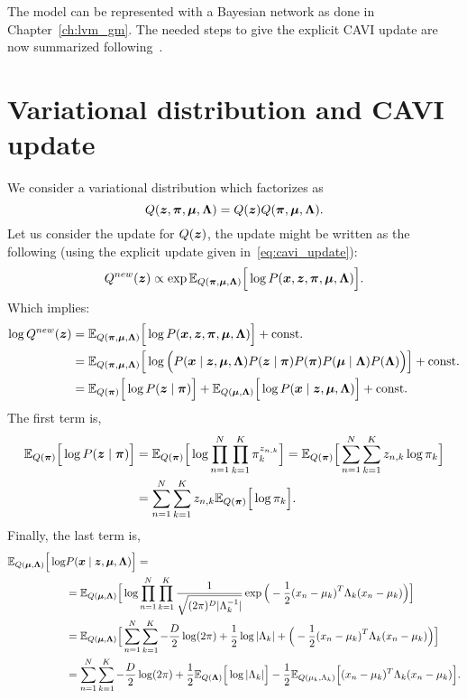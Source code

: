 The model can be represented with a Bayesian network as done in Chapter~\ref{ch:lvm_gm}. The needed steps to give the explicit CAVI update are now summarized following~\cite{bishop2006pattern}.

\section{Variational distribution and CAVI update}

We consider a variational distribution which factorizes as
\[
  Q(\bm{z}, \bm{\pi}, \bm{\mu}, \bm{\Lambda}) = Q(\bm{z})Q(\bm{\pi}, \bm{\mu}, \bm{\Lambda}).
\]
Let us consider the update for \(Q(\bm{z})\), the update might be written as the following (using the explicit update given in~\ref{eq:cavi_update}):
\[
  Q^{new}(\bm{z}) \propto \exp \mathbb{E}_{Q(\bm{\pi}, \bm{\mu}, \bm{\Lambda})}\Big[\log P(\bm{x}, \bm{z}, \bm{\pi}, \bm{\mu}, \bm{\Lambda})\Big].
\]
Which implies:
\[
  \begin{aligned}
    \log Q^{new}(\bm{z}) &= \mathbb{E}_{Q(\bm{\pi}, \bm{\mu}, \bm{\Lambda})}\Big[\log P(\bm{x}, \bm{z}, \bm{\pi}, \bm{\mu}, \bm{\Lambda})\Big] + \text{const.}\\
    &= \mathbb{E}_{Q(\bm{\pi}, \bm{\mu}, \bm{\Lambda})}\Big[\log \Big( P(\bm{x} \mid \bm{z}, \bm{\mu}, \bm{\Lambda})P(\bm{z} \mid \bm{\pi})P(\bm{\pi})P(\bm{\mu} \mid \bm{\Lambda})P(\bm{\Lambda}) \Big)\Big] + \text{const.}\\
    &= \mathbb{E}_{Q(\bm{\pi})}\Big[\log P(\bm{z} \mid \bm{\pi})\Big] + \mathbb{E}_{Q(\bm{\mu}, \bm{\Lambda})}\Big[\log P(\bm{x} \mid \bm{z}, \bm{\mu}, \bm{\Lambda})\Big] + \text{const.}
  \end{aligned}
\]
The first term is,
\[
  \begin{aligned}
    \mathbb{E}_{Q(\bm{\pi})}\Big[\log P(\bm{z} \mid \bm{\pi})\Big] &=  \mathbb{E}_{Q(\bm{\pi})}\Big[\log \prod_{n=1}^{N}\prod_{k=1}^{K}\pi_{k}^{z_{n,k}}\Big] = \mathbb{E}_{Q(\bm{\pi})}\Big[\sum_{n=1}^{N}\sum_{k=1}^{K}z_{n,k}\log \pi_{k}\Big]\\
    &= \sum_{n=1}^{N}\sum_{k=1}^{K}z_{n,k} \mathbb{E}_{Q(\bm{\pi})}\Big[\log \pi_{k}\Big].
  \end{aligned}
\]
Finally, the last term is,
\[
    \begin{aligned}
    \mathbb{E}_{Q(\bm{\mu}, \bm{\Lambda})}\Big[\log& P(\bm{x} \mid \bm{z}, \bm{\mu}, \bm{\Lambda})\Big] =\\
    &=  \mathbb{E}_{Q(\bm{\mu}, \bm{\Lambda})}\Big[\log \prod_{n=1}^{N}\prod_{k=1}^{K} \frac{1}{\sqrt{(2\pi)^{D}|\Lambda_{k}^{-1}|}} \exp \Big( -\frac{1}{2}{(x_{n} - \mu_{k})}^{T}\Lambda_{k}(x_{n}- \mu_{k}) \Big)  \Big]\\
    &=  \mathbb{E}_{Q(\bm{\mu}, \bm{\Lambda})}\Big[ \sum_{n=1}^{N}\sum_{k=1}^{K}- \frac{D}{2}\log (2\pi)+  \frac{1}{2}\log |\Lambda_{k}|+ \Big( -\frac{1}{2}{(x_{n} - \mu_{k})}^{T}\Lambda_{k}(x_{n}- \mu_{k}) \Big)  \Big]\\
    &=  \sum_{n=1}^{N}\sum_{k=1}^{K}  - \frac{D}{2} \log (2\pi)+ \frac{1}{2}\mathbb{E}_{Q(\bm{\Lambda})}\Big[\log |\Lambda_{k}|\Big]- \frac{1}{2}\mathbb{E}_{Q(\mu_{k}, \Lambda_{k})}\Big[(x_{n} - \mu_{k})^{T}\Lambda_{k}(x_{n} - \mu_{k})\Big].
    \end{aligned}
\]
